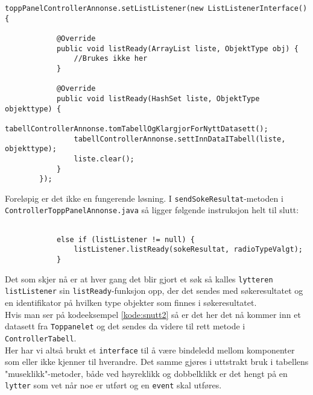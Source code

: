 \begin{lstlisting}[caption=Setter lytter fra \texttt{MainController.java},label=kode:snutt2]
        toppPanelControllerAnnonse.setListListener(new ListListenerInterface() {

            @Override
            public void listReady(ArrayList liste, ObjektType obj) {
                //Brukes ikke her
            }

            @Override
            public void listReady(HashSet liste, ObjektType objekttype) {
                tabellControllerAnnonse.tomTabellOgKlargjorForNyttDatasett();
                tabellControllerAnnonse.settInnDataITabell(liste, objekttype);
                liste.clear();
            }
        });
\end{lstlisting}

Foreløpig er det ikke en fungerende løsning. I \texttt{sendSokeResultat}-metoden i \texttt{ControllerToppPanelAnnonse.java} så ligger følgende instruksjon helt til slutt:
\begin{lstlisting}[caption=Utdrag fra \texttt{sendSokeResultat}-metoden i \texttt{ControllerToppPanelAnnonse.java},label=kode:snutt3]

            else if (listListener != null) {
                listListener.listReady(sokeResultat, radioTypeValgt);
            }
\end{lstlisting}

Det som skjer nå er at hver gang det blir gjort et søk så kalles \texttt{lytteren listListener} sin \texttt{listReady}-funksjon opp, der det sendes med søkeresultatet og en identifikator på hvilken type objekter som finnes i søkeresultatet.\\
Hvis man ser på kodeeksempel \ref{kode:snutt2} så er det her det nå kommer inn et datasett fra \texttt{Toppanelet} og det sendes da videre til rett metode i \texttt{ControllerTabell}.\\
Her har vi altså brukt et \texttt{interface} til å være bindeledd mellom komponenter som eller ikke kjenner til hverandre. Det samme gjøres i uttstrakt bruk i tabellens "museklikk"-metoder, både ved høyreklikk og dobbelklikk er det hengt på en \texttt{lytter} som vet når noe er utført og en \texttt{event} skal utføres.
 
